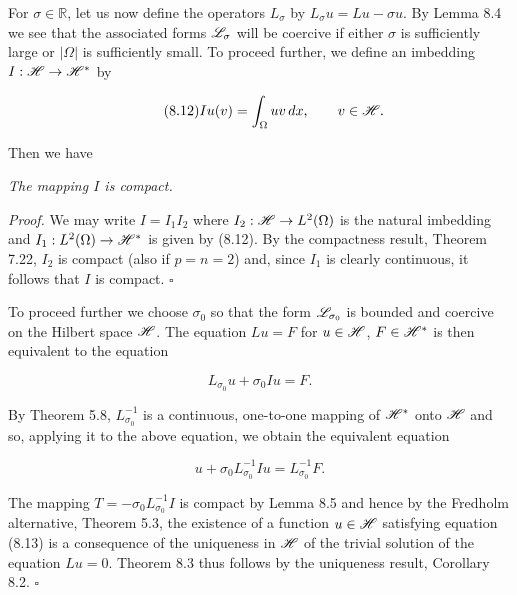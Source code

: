 


For $\sigma \in \mathbb{R}$, let us now define the operators $L_\sigma$ by $L_\sigma u = Lu - \sigma u$. By Lemma 8.4 we see that the associated forms $\mathscr{L}_\sigma$ will be coercive if either $\sigma$ is sufficiently large or $|\Omega|$ is sufficiently small. To proceed further, we define an imbedding $I : \mathscr{H} \to \mathscr{H}^*$ by

\begin{equation}
\tag{8.12}
Iu(v) = \int_\Omega uv \, dx,\qquad v \in \mathscr{H}.
\end{equation}

Then we have

\begin{lemma}\label{gt-lem-8-5-compact-embedding}
\textit{The mapping $I$ is compact.}

\textit{Proof.} We may write $I = I_1 I_2$ where $I_2 : \mathscr{H} \to L^2(\Omega)$ is the natural imbedding and $I_1 : L^2(\Omega) \to \mathscr{H}^*$ is given by (8.12). By the compactness result, Theorem 7.22, $I_2$ is compact (also if $p = n = 2$) and, since $I_1$ is clearly continuous, it follows that $I$ is compact. $\square$
\end{lemma}

To proceed further we choose $\sigma_0$ so that the form $\mathscr{L}_{\sigma_0}$ is bounded and coercive on the Hilbert space $\mathscr{H}$. The equation $Lu = F$ for $u \in \mathscr{H}$, $F \in \mathscr{H}^*$ is then equivalent to the equation

\[
L_{\sigma_0}u + \sigma_0 Iu = F.
\]

By Theorem 5.8, $L_{\sigma_0}^{-1}$ is a continuous, one-to-one mapping of $\mathscr{H}^*$ onto $\mathscr{H}$ and so, applying it to the above equation, we obtain the equivalent equation

\begin{equation}
\tag{8.13}
u + \sigma_0 L_{\sigma_0}^{-1} Iu = L_{\sigma_0}^{-1}F.
\end{equation}

The mapping $T = -\sigma_0 L_{\sigma_0}^{-1} I$ is compact by Lemma 8.5 and hence by the Fredholm alternative, Theorem 5.3, the existence of a function $u \in \mathscr{H}$ satisfying equation (8.13) is a consequence of the uniqueness in $\mathscr{H}$ of the trivial solution of the equation $Lu = 0$. Theorem 8.3 thus follows by the uniqueness result, Corollary 8.2. $\square$

